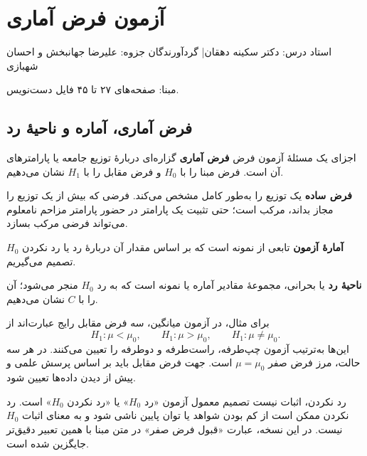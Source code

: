 \documentclass[12pt,a4paper,oneside]{report}
\newcounter{ex}[chapter]
\newcommand{\source}[1]{\par{\small\color{muted} مبنا: صفحه‌های #1 فایل دست‌نویس.}\par}
\begin{document}
\setcounter{chapter}{3}
\chapter{آزمون فرض آماری}
\begin{center}{\small\color{muted} استاد درس: دکتر سکینه دهقان\quad | \quad گردآورندگان جزوه: علیرضا جهانبخش و احسان شهبازی}\end{center}

\source{۲۷ تا ۴۵}
\section{فرض آماری، آماره و ناحیهٔ رد}
\begin{definition}{اجزای یک مسئلهٔ آزمون فرض}
\textbf{فرض آماری} گزاره‌ای دربارهٔ توزیع جامعه یا پارامترهای آن است. فرض مبنا را با $H_0$ و فرض مقابل را با $H_1$ نشان می‌دهیم.

\textbf{فرض ساده} یک توزیع را به‌طور کامل مشخص می‌کند. فرضی که بیش از یک توزیع را مجاز بداند، مرکب است؛ حتی تثبیت یک پارامتر در حضور پارامتر مزاحم نامعلوم می‌تواند فرضی مرکب بسازد.

\textbf{آمارهٔ آزمون} تابعی از نمونه است که بر اساس مقدار آن دربارهٔ رد یا رد نکردن $H_0$ تصمیم می‌گیریم.

\textbf{ناحیهٔ رد} یا بحرانی، مجموعهٔ مقادیر آماره یا نمونه است که به رد $H_0$ منجر می‌شود؛ آن را با $C$ نشان می‌دهیم.
\end{definition}
برای مثال، در آزمون میانگین، سه فرض مقابل رایج عبارت‌اند از
\[
H_1:\mu<\mu_0,\qquad H_1:\mu>\mu_0,\qquad H_1:\mu\ne\mu_0.
\]
این‌ها به‌ترتیب آزمون چپ‌طرفه، راست‌طرفه و دوطرفه را تعیین می‌کنند. در هر سه حالت، مرز فرض صفر $\mu=\mu_0$ است. جهت فرض مقابل باید بر اساس پرسش علمی و پیش از دیدن داده‌ها تعیین شود.
\begin{important}{رد نکردن، اثبات نیست}
تصمیم معمول آزمون «رد $H_0$» یا «رد نکردن $H_0$» است. رد نکردن ممکن است از کم بودن شواهد یا توان پایین ناشی شود و به معنای اثبات $H_0$ نیست. در این نسخه، عبارت «قبول فرض صفر» در متن مبنا با همین تعبیر دقیق‌تر جایگزین شده است.
\end{important}
\end{document}
